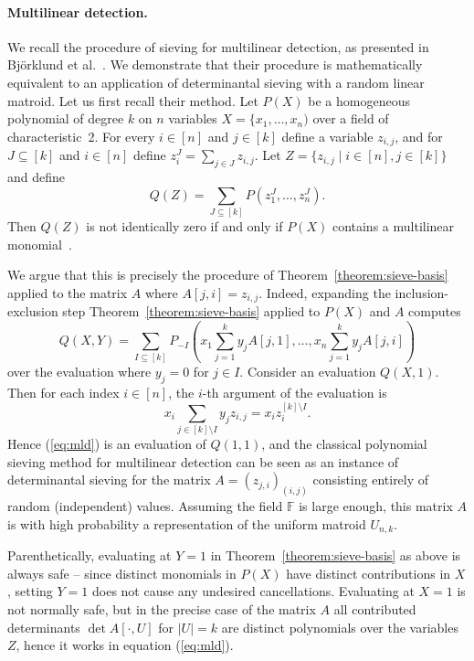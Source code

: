 \documentclass[10pt,a4paper]{article}
\newcommand{\F}{\ensuremath{\mathbb F}\xspace}
\begin{document}
\paragraph{Multilinear detection.} 
We recall the procedure of sieving for multilinear detection, as
presented in Björklund et al.~\cite{BjorklundKK16}.
We demonstrate that their procedure is mathematically equivalent
to an application of determinantal sieving with a random linear matroid.
Let us first recall their method. 
Let $P(X)$ be a homogeneous polynomial of degree $k$ on $n$ variables
$X=\{x_1,\ldots,x_n)$ over a field of characteristic~2. For every $i \in [n]$ and $j \in [k]$ define a
variable $z_{i,j}$, and for $J \subseteq [k]$ and $i \in [n]$
define $z_i^J=\sum_{j \in J} z_{i,j}$.
Let $Z=\{z_{i,j} \mid i \in [n], j \in [k]\}$ and define
\begin{equation}
  Q(Z) = \sum_{J \subseteq [k]} P(z_1^J, \ldots, z_n^J).
  \label{eq:mld}
\end{equation}
Then $Q(Z)$ is not identically zero if and only if $P(X)$ contains a
multilinear monomial~\cite{BjorklundKK16}.

We argue that this is precisely the procedure of Theorem~\ref{theorem:sieve-basis}
applied to the matrix $A$ where $A[j,i]=z_{i,j}$.
Indeed, expanding the inclusion-exclusion step Theorem~\ref{theorem:sieve-basis}
applied to $P(X)$ and $A$
computes
\[
  Q(X,Y) = \sum_{I \subseteq [k]} P_{-I}(x_1 \sum_{j=1}^k y_j A[j,1], \ldots, x_n \sum_{j=1}^k y_j A[j,i])
\]
over the evaluation where $y_j=0$ for $j \in I$. Consider an evaluation $Q(X,1)$.
Then for each index $i \in [n]$, the $i$-th argument of the evaluation is
\[
  x_i \sum_{j \in [k] \setminus I}  y_j z_{i,j} = x_i z_i^{[k] \setminus I}.
\]
Hence (\ref{eq:mld}) is an evaluation of $Q(1,1)$,
and the classical polynomial sieving method for multilinear detection 
can be seen as an instance of determinantal sieving for the matrix $A=(z_{j,i})_{(i,j)}$
consisting entirely of random (independent) values.
Assuming the field $\F$ is large enough, this matrix $A$ is with high
probability a representation of the uniform matroid $U_{n,k}$.

Parenthetically, evaluating at $Y =1$ in Theorem~\ref{theorem:sieve-basis}
as above is always safe -- since distinct monomials in $P(X)$ have
distinct contributions in $X$, setting $Y=1$ does not cause any
undesired cancellations. Evaluating at $X=1$ is not normally safe,
but in the precise case of the matrix $A$ all contributed determinants
$\det A[\cdot,U]$ for $|U|=k$ are distinct polynomials over the
variables $Z$, hence it works in equation (\ref{eq:mld}).
\end{document}
